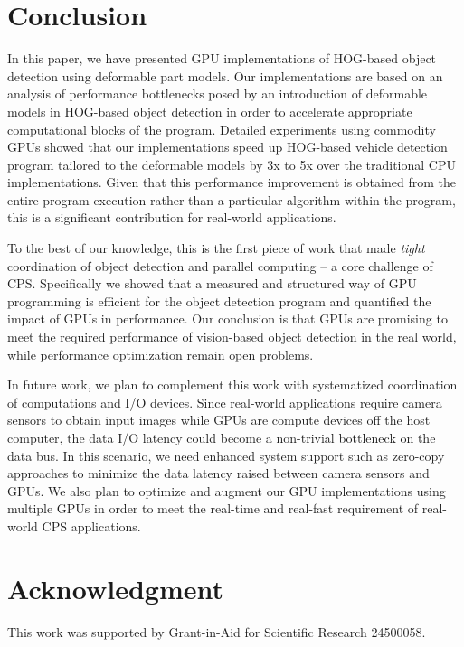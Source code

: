 \section{Conclusion}
\label{sec:conclusion}

In this paper, we have presented GPU implementations of HOG-based object
detection using deformable part models.
Our implementations are based on an analysis of performance bottlenecks 
posed by an introduction of deformable models in HOG-based object
detection in order to accelerate appropriate computational blocks of the
program.
Detailed experiments using commodity GPUs showed that our
implementations speed up HOG-based vehicle detection program tailored to
the deformable models by 3x to 5x over the traditional CPU
implementations.
Given that this performance improvement is obtained from the entire
program execution rather than a particular algorithm within the program,
this is a significant contribution for real-world applications.

To the best of our knowledge, this is the first piece of work that made
\textit{tight} coordination of object detection and parallel computing
-- a core challenge of CPS.
Specifically we showed that a measured and structured way of GPU
programming is efficient for the object detection program and quantified
the impact of GPUs in performance.
Our conclusion is that GPUs are promising to meet the required
performance of vision-based object detection in the real world, while
performance optimization remain open problems.

In future work, we plan to complement this work with systematized
coordination of computations and I/O devices.
Since real-world applications require camera sensors to obtain input
images while GPUs are compute devices off the host computer, the data
I/O latency could become a non-trivial bottleneck on the data bus.
In this scenario, we need enhanced system support such as zero-copy
approaches \cite{Kato13} to minimize the data latency raised between
camera sensors and GPUs.
We also plan to optimize and augment our GPU implementations using
multiple GPUs in order to meet the real-time and real-fast requirement
of real-world CPS applications.

\section*{Acknowledgment}

This work was supported by Grant-in-Aid for Scientific Research 24500058.